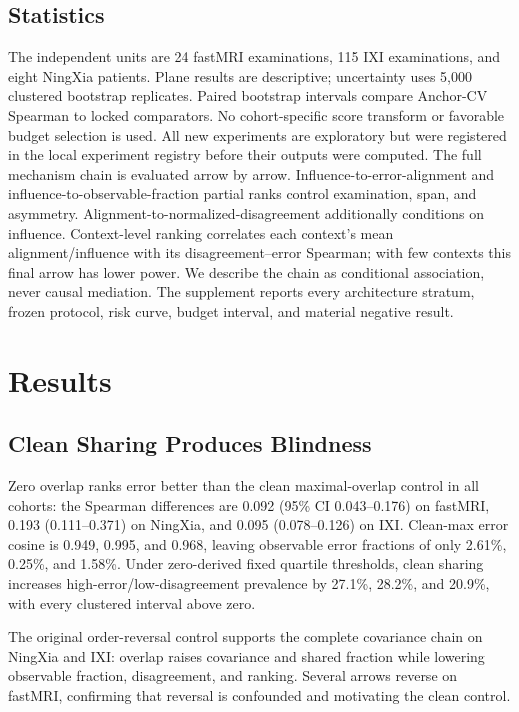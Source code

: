 \documentclass[10pt,twocolumn,letterpaper]{article}
\begin{document}
\subsection{Statistics}
The independent units are 24 fastMRI examinations, 115 IXI examinations, and eight NingXia patients. Plane results are descriptive; uncertainty uses 5,000 clustered bootstrap replicates. Paired bootstrap intervals compare Anchor-CV Spearman to locked comparators. No cohort-specific score transform or favorable budget selection is used. All new experiments are exploratory but were registered in the local experiment registry before their outputs were computed.
The full mechanism chain is evaluated arrow by arrow. Influence-to-error-alignment and influence-to-observable-fraction partial ranks control examination, span, and asymmetry. Alignment-to-normalized-disagreement additionally conditions on influence. Context-level ranking correlates each context's mean alignment/influence with its disagreement--error Spearman; with few contexts this final arrow has lower power. We describe the chain as conditional association, never causal mediation. The supplement reports every architecture stratum, frozen protocol, risk curve, budget interval, and material negative result.

\section{Results}
\subsection{Clean Sharing Produces Blindness}
Zero overlap ranks error better than the clean maximal-overlap control in all cohorts: the Spearman differences are 0.092 (95\% CI 0.043--0.176) on fastMRI, 0.193 (0.111--0.371) on NingXia, and 0.095 (0.078--0.126) on IXI. Clean-max error cosine is 0.949, 0.995, and 0.968, leaving observable error fractions of only 2.61\%, 0.25\%, and 1.58\%. Under zero-derived fixed quartile thresholds, clean sharing increases high-error/low-disagreement prevalence by 27.1\%, 28.2\%, and 20.9\%, with every clustered interval above zero.

The original order-reversal control supports the complete covariance chain on NingXia and IXI: overlap raises covariance and shared fraction while lowering observable fraction, disagreement, and ranking. Several arrows reverse on fastMRI, confirming that reversal is confounded and motivating the clean control.
\end{document}
